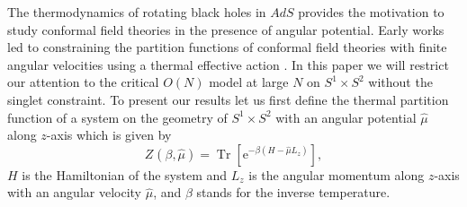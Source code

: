\documentclass[a4paper,11pt]{article}
\newcommand{\e}{\mathrm e}
\begin{document}
	The thermodynamics of rotating black holes in $AdS$ provides the motivation to study conformal field theories 
	in the presence of angular potential. 
	Early works led to constraining the partition functions of conformal field theories with finite angular velocities 
	using a thermal effective action \cite{Bhattacharyya:2007vs,Banerjee:2012iz,Jensen:2012jh,Shaghoulian:2015lcn}. 
	In this paper we will restrict our attention to the critical $O(N)$ model at large $N$  on $S^1\times S^2$ without the singlet constraint.
	To present our results let us first define the 
	thermal partition function of  a system 
	on the geometry of $S^1\times S^2$ with an angular potential $\hat\mu$ along $z$-axis which is  given by
	\begin{equation}
		Z_{}(\beta,\hat\mu)
		=\operatorname{Tr}\!\left[\e^{-\beta(H-\hat\mu L_z)}\right],
	\end{equation}
	$H$ is the Hamiltonian of the system and $L_z$ is the angular momentum along $z$-axis with an angular velocity $\hat \mu$, and 
	$\beta $ stands for the inverse temperature. 
	
\end{document}
